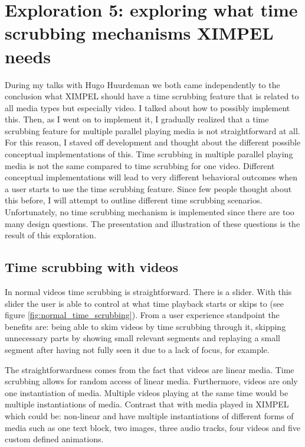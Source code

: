 
\chapter{Exploration 5: exploring what time scrubbing mechanisms XIMPEL needs}

During my talks with Hugo Huurdeman we both came independently to the conclusion what XIMPEL should have a time scrubbing feature that is related to all media types but especially video. I talked about how to possibly implement this. Then, as I went on to implement it, I gradually realized that a time scrubbing feature for multiple parallel playing media is not straightforward at all. For this reason, I staved off development and thought about the different possible conceptual implementations of this. Time scrubbing in multiple parallel playing media is not the same compared to time scrubbing for one video. Different conceptual implementations will lead to very different behavioral outcomes when a user starts to use the time scrubbing feature. Since few people thought about this before, I will attempt to outline different time scrubbing scenarios. Unfortunately, no time scrubbing mechanism is implemented since there are too many design questions. The presentation and illustration of these questions is the result of this exploration.



\section{Time scrubbing with videos}
In normal videos time scrubbing is straightforward. There is a slider. With this slider the user is able to control at what time playback starts or skips to (see figure \ref{fig:normal_time_scrubbing}). From a user experience standpoint the benefits are: being able to skim videos by time scrubbing through it, skipping unnecessary parts by showing small relevant segments and replaying a small segment after having not fully seen it due to a lack of focus, for example.

The straightforwardness comes from the fact that videos are linear media. Time scrubbing allows for random access of linear media. Furthermore, videos are only one instantiation of media. Multiple videos playing at the same time would be multiple instantiations of media. Contrast that with media played in XIMPEL which could be: non-linear and have multiple instantiations of different forms of media such as one text block, two images, three audio tracks, four videos and five custom defined animations.

